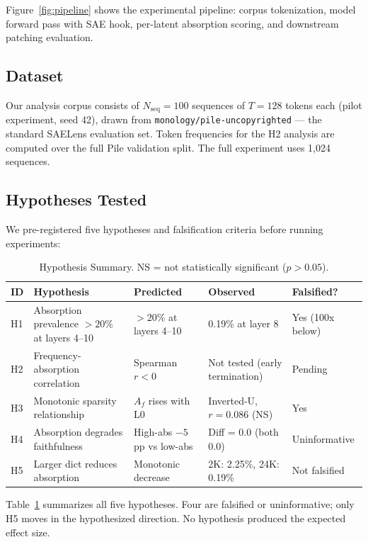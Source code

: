 \documentclass{article}
\begin{document}
Figure~\ref{fig:pipeline} shows the experimental pipeline: corpus tokenization, model forward pass with SAE hook, per-latent absorption scoring, and downstream patching evaluation.

\subsection{Dataset}

Our analysis corpus consists of $N_{\text{seq}} = 100$ sequences of $T = 128$ tokens each (pilot experiment, seed 42), drawn from \texttt{monology/pile-uncopyrighted} --- the standard SAELens evaluation set. Token frequencies for the H2 analysis are computed over the full Pile validation split. The full experiment uses 1,024 sequences.

\subsection{Hypotheses Tested}

We pre-registered five hypotheses and falsification criteria before running experiments:

\begin{table}[t]
\caption{Hypothesis Summary. NS = not statistically significant ($p > 0.05$).}
\label{tab:hypothesis_summary}
\centering
\begin{tabular}{lllll}
\toprule
ID & Hypothesis & Predicted & Observed & Falsified? \\
\midrule
H1 & Absorption prevalence $>20\%$ at layers 4--10 & $>20\%$ at layers 4--10 & 0.19\% at layer 8 & Yes (100x below) \\
H2 & Frequency-absorption correlation & Spearman $r < 0$ & Not tested (early termination) & Pending \\
H3 & Monotonic sparsity relationship & $A_f$ rises with L0 & Inverted-U, $r = 0.086$ (NS) & Yes \\
H4 & Absorption degrades faithfulness & High-abs $-5$pp vs low-abs & Diff = 0.0 (both 0.0) & Uninformative \\
H5 & Larger dict reduces absorption & Monotonic decrease & 2K: 2.25\%, 24K: 0.19\% & Not falsified \\
\bottomrule
\end{tabular}
\end{table}

Table~\ref{tab:hypothesis_summary} summarizes all five hypotheses. Four are falsified or uninformative; only H5 moves in the hypothesized direction. No hypothesis produced the expected effect size.
\end{document}
